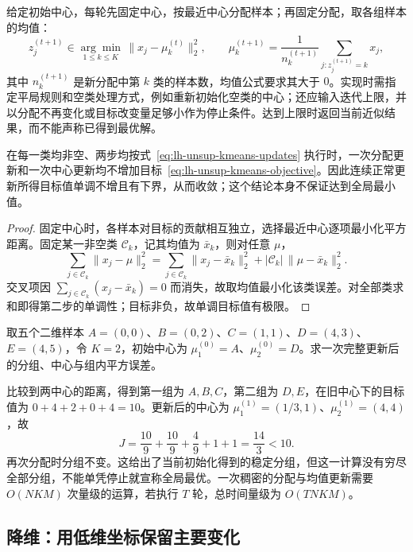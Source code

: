 给定初始中心，每轮先固定中心，按最近中心分配样本；再固定分配，取各组样本的均值：
\begin{equation}
z_j^{(t+1)}\in\underset{1\leq k\leq K}{\arg\min}\,
\|x_j-\mu_k^{(t)}\|_2^2,\qquad
\mu_k^{(t+1)}=\frac1{n_k^{(t+1)}}
\sum_{j:z_j^{(t+1)}=k}x_j,
\label{eq:lh-unsup-kmeans-updates}
\end{equation}
其中 $n_k^{(t+1)}$ 是新分配中第 $k$ 类的样本数，均值公式要求其大于 $0$。实现时需指定平局规则和空类处理方式，例如重新初始化空类的中心；还应输入迭代上限，并以分配不再变化或目标改变量足够小作为停止条件。达到上限时返回当前近似结果，而不能声称已得到最优解。

\begin{proposition}[$K$ 均值正常更新的单调性]
\label{prop:lh-unsup-kmeans-descent}
在每一类均非空、两步均按式~\eqref{eq:lh-unsup-kmeans-updates} 执行时，一次分配更新和一次中心更新均不增加目标~\eqref{eq:lh-unsup-kmeans-objective}。因此连续正常更新所得目标值单调不增且有下界，从而收敛；这个结论本身不保证达到全局最小值。
\end{proposition}
\begin{proof}
固定中心时，各样本对目标的贡献相互独立，选择最近中心逐项最小化平方距离。固定某一非空类 $\mathcal C_k$，记其均值为 $\bar x_k$，则对任意 $\mu$，
\[
\sum_{j\in\mathcal C_k}\|x_j-\mu\|_2^2
=\sum_{j\in\mathcal C_k}\|x_j-\bar x_k\|_2^2
+|\mathcal C_k|\,\|\mu-\bar x_k\|_2^2.
\]
交叉项因 $\sum_{j\in\mathcal C_k}(x_j-\bar x_k)=0$ 而消失，故取均值最小化该类误差。对全部类求和即得第二步的单调性；目标非负，故单调目标值有极限。
\end{proof}

\begin{example}
\label{ex:lh-unsup-kmeans}
取五个二维样本 $A=(0,0)$、$B=(0,2)$、$C=(1,1)$、$D=(4,3)$、$E=(4,5)$，令 $K=2$，初始中心为 $\mu_1^{(0)}=A$、$\mu_2^{(0)}=D$。求一次完整更新后的分组、中心与组内平方误差。
\end{example}
\begin{solve}
比较到两中心的距离，得到第一组为 $A,B,C$，第二组为 $D,E$，在旧中心下的目标值为 $0+4+2+0+4=10$。更新后的中心为 $\mu_1^{(1)}=(1/3,1)$、$\mu_2^{(1)}=(4,4)$，故
\[
J=\frac{10}{9}+\frac{10}{9}+\frac49+1+1
=\frac{14}{3}<10.
\]
再次分配时分组不变。这给出了当前初始化得到的稳定分组，但这一计算没有穷尽全部分组，不能单凭停止就宣称全局最优。一次稠密的分配与均值更新需要 $O(NKM)$ 次量级的运算，若执行 $T$ 轮，总时间量级为 $O(TNKM)$。
\end{solve}

\subsection{降维：用低维坐标保留主要变化}
\label{subsec:lh-unsup-pca}

